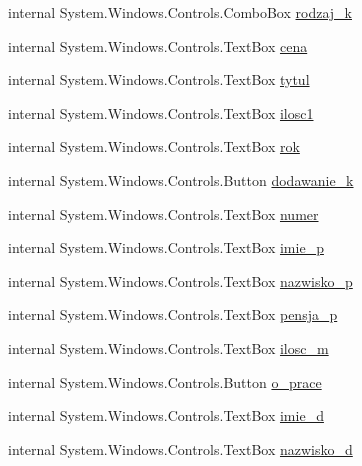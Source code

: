 \begin{DoxyCompactItemize}
\item 
internal System.\+Windows.\+Controls.\+Combo\+Box \mbox{\hyperlink{class_projekt1_1_1_main_window_a6357072d937321858145e59774acf044}{rodzaj\+\_\+k}}
\item 
internal System.\+Windows.\+Controls.\+Text\+Box \mbox{\hyperlink{class_projekt1_1_1_main_window_aeeea68ccaa9a4bdb916f72ad7b5dd31a}{cena}}
\item 
internal System.\+Windows.\+Controls.\+Text\+Box \mbox{\hyperlink{class_projekt1_1_1_main_window_a3ec318b67b226fb631f4cdfa713cfff5}{tytul}}
\item 
internal System.\+Windows.\+Controls.\+Text\+Box \mbox{\hyperlink{class_projekt1_1_1_main_window_acdc947d39a971a6777027aa03f888bc2}{ilosc1}}
\item 
internal System.\+Windows.\+Controls.\+Text\+Box \mbox{\hyperlink{class_projekt1_1_1_main_window_a587b3442571ae933225ba0d41664604c}{rok}}
\item 
internal System.\+Windows.\+Controls.\+Button \mbox{\hyperlink{class_projekt1_1_1_main_window_ab348858128509a13423f2657530af8c5}{dodawanie\+\_\+k}}
\item 
internal System.\+Windows.\+Controls.\+Text\+Box \mbox{\hyperlink{class_projekt1_1_1_main_window_a46ead5bdca521eac69475937b9db8381}{numer}}
\item 
internal System.\+Windows.\+Controls.\+Text\+Box \mbox{\hyperlink{class_projekt1_1_1_main_window_a127281a9dba6e02e34a4578a4f76e159}{imie\+\_\+p}}
\item 
internal System.\+Windows.\+Controls.\+Text\+Box \mbox{\hyperlink{class_projekt1_1_1_main_window_ab9843d967a0b6b7c286562d8f9d06e05}{nazwisko\+\_\+p}}
\item 
internal System.\+Windows.\+Controls.\+Text\+Box \mbox{\hyperlink{class_projekt1_1_1_main_window_aa3f0f1f21660909583a7f4a4a07b5aa1}{pensja\+\_\+p}}
\item 
internal System.\+Windows.\+Controls.\+Text\+Box \mbox{\hyperlink{class_projekt1_1_1_main_window_ad51196a5e8b654b6d8138db2b6c8cccd}{ilosc\+\_\+m}}
\item 
internal System.\+Windows.\+Controls.\+Button \mbox{\hyperlink{class_projekt1_1_1_main_window_a2fefe76d3a500b912852632aac3a793a}{o\+\_\+prace}}
\item 
internal System.\+Windows.\+Controls.\+Text\+Box \mbox{\hyperlink{class_projekt1_1_1_main_window_acb3d696410f96b407bea18670bb92c7d}{imie\+\_\+d}}
\item 
internal System.\+Windows.\+Controls.\+Text\+Box \mbox{\hyperlink{class_projekt1_1_1_main_window_a41efac84a795b15815d142547987fcc1}{nazwisko\+\_\+d}}

\end{DoxyCompactItemize}

